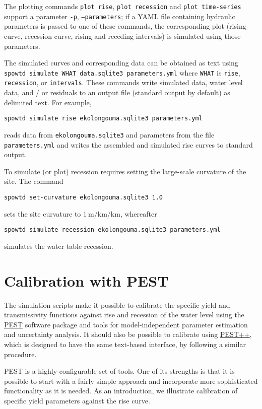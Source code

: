 \documentclass[11pt,a4paper]{article}
\begin{document}
The plotting commands \texttt{plot rise}, \texttt{plot recession} and
\texttt{plot time-series} support a parameter \texttt{-p},
\texttt{--parameters}; if a YAML file containing hydraulic parameters
is passed to one of these commands, the corresponding plot (rising
curve, recession curve, rising and receding intervals) is simulated
using those parameters.

The simulated curves and corresponding data can be obtained as text
using \texttt{spowtd simulate WHAT data.sqlite3 parameters.yml} where
\texttt{WHAT} is \texttt{rise}, \texttt{recession}, or
\texttt{intervals}.  These commands write simulated data, water level
data, and / or residuals to an output file (standard output by
default) as delimited text.  For example,
\begin{lstlisting}[frame=single]
spowtd simulate rise ekolongouma.sqlite3 parameters.yml
\end{lstlisting}
reads data from \texttt{ekolongouma.sqlite3} and parameters from the
file \texttt{parameters.yml} and writes the assembled and simulated
rise curves to standard output.

To simulate (or plot) recession requires setting the large-scale
curvature of the site.  The command
\begin{lstlisting}[frame=single]
  spowtd set-curvature ekolongouma.sqlite3 1.0
\end{lstlisting}
sets the site curvature to $1~\text{m}/\text{km}/\text{km}$, whereafter
\begin{lstlisting}[frame=single]
  spowtd simulate recession ekolongouma.sqlite3 parameters.yml
\end{lstlisting}
simulates the water table recession.

\section{Calibration with PEST}
The simulation scripts make it possible to calibrate the specific
yield and transmissivity functions against rise and recession of the
water level using the \href{https://pesthomepage.org/}{PEST} software
package and tools for model-independent parameter estimation and
uncertainty analysis.  It should also be possible to calibrate using
\href{https://www.usgs.gov/software/pest-software-suite-parameter-estimation-uncertainty-analysis-management-optimization-and}{PEST++},
which is designed to have the same text-based interface, by following
a similar procedure.

PEST is a highly configurable set of tools.  One of its strengths is
that it is possible to start with a fairly simple approach and
incorporate more sophisticated functionality as it is needed.  As an
introduction, we illustrate calibration of specific yield parameters
against the rise curve.
\end{document}
